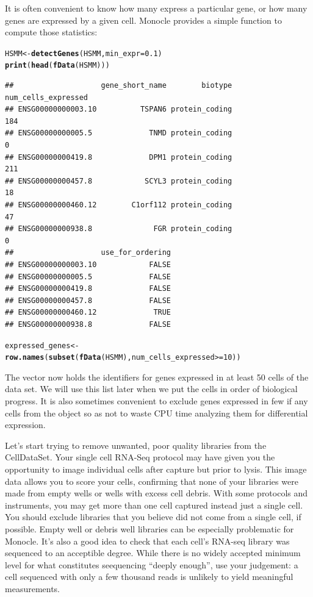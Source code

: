 \documentclass[10pt,oneside]{article}\usepackage[]{graphicx}\usepackage[]{color}
\makeatletter
\newcommand{\hlnum}[1]{\textcolor[rgb]{0.686,0.059,0.569}{#1}}%
\newcommand{\hlopt}[1]{\textcolor[rgb]{0,0,0}{#1}}%
\newcommand{\hlstd}[1]{\textcolor[rgb]{0.345,0.345,0.345}{#1}}%
\newcommand{\hlkwb}[1]{\textcolor[rgb]{0.69,0.353,0.396}{#1}}%
\newcommand{\hlkwc}[1]{\textcolor[rgb]{0.333,0.667,0.333}{#1}}%
\newcommand{\hlkwd}[1]{\textcolor[rgb]{0.737,0.353,0.396}{\textbf{#1}}}%
\newenvironment{kframe}{%
 \def\at@end@of@kframe{}%
 \ifinner\ifhmode%
  \def\at@end@of@kframe{\end{minipage}}%
  \begin{minipage}{\columnwidth}%
 \fi\fi%
 \def\FrameCommand##1{\hskip\@totalleftmargin \hskip-\fboxsep
 \colorbox{shadecolor}{##1}\hskip-\fboxsep
     \hskip-\linewidth \hskip-\@totalleftmargin \hskip\columnwidth}%
 \MakeFramed {\advance\hsize-\width
   \@totalleftmargin\z@ \linewidth\hsize
   \@setminipage}}%
 {\par\unskip\endMakeFramed%
 \at@end@of@kframe}
\newenvironment{knitrout}{}{} %
\makeatother
\begin{document}
 It is often convenient to know how many express a particular gene, or how many genes are expressed by a given cell. Monocle provides a simple function to compute those statistics: 
\begin{knitrout}
\color{fgcolor}\begin{kframe}
\begin{alltt}
\hlstd{HSMM} \hlkwb{<-} \hlkwd{detectGenes}\hlstd{(HSMM,} \hlkwc{min_expr} \hlstd{=} \hlnum{0.1}\hlstd{)}
\hlkwd{print}\hlstd{(}\hlkwd{head}\hlstd{(}\hlkwd{fData}\hlstd{(HSMM)))}
\end{alltt}
\begin{verbatim}
##                    gene_short_name        biotype num_cells_expressed
## ENSG00000000003.10          TSPAN6 protein_coding                 184
## ENSG00000000005.5             TNMD protein_coding                   0
## ENSG00000000419.8             DPM1 protein_coding                 211
## ENSG00000000457.8            SCYL3 protein_coding                  18
## ENSG00000000460.12        C1orf112 protein_coding                  47
## ENSG00000000938.8              FGR protein_coding                   0
##                    use_for_ordering
## ENSG00000000003.10            FALSE
## ENSG00000000005.5             FALSE
## ENSG00000000419.8             FALSE
## ENSG00000000457.8             FALSE
## ENSG00000000460.12             TRUE
## ENSG00000000938.8             FALSE
\end{verbatim}
\begin{alltt}
\hlstd{expressed_genes} \hlkwb{<-} \hlkwd{row.names}\hlstd{(}\hlkwd{subset}\hlstd{(}\hlkwd{fData}\hlstd{(HSMM), num_cells_expressed} \hlopt{>=} \hlnum{10}\hlstd{))}
\end{alltt}
\end{kframe}
\end{knitrout}
 
 The vector  now holds the identifiers for genes expressed in at least 50 cells of the data set. We will use this list later when we put the cells in order of biological progress. It is also sometimes convenient to exclude genes expressed in few if any cells from the  object so as not to waste CPU time analyzing them for differential expression.
 
 Let's start trying to remove unwanted, poor quality libraries from the CellDataSet. Your single cell RNA-Seq protocol may have given you the opportunity to image individual cells after capture but prior to lysis. This image data allows you to score your cells, confirming that none of your libraries were made from empty wells or wells with excess cell debris.  With some protocols and instruments, you may get more than one cell captured instead just a single cell. You should exclude libraries that you believe did not come from a single cell, if possible. Empty well or debris well libraries can be especially problematic for Monocle. It's also a good idea to check that each cell's RNA-seq library was sequenced to an acceptible degree.  While there is no widely accepted minimum level for what constitutes seequencing ``deeply enough'', use your judgement: a cell sequenced with only a few thousand reads is unlikely to yield meaningful measurements.   
 
\end{document}
